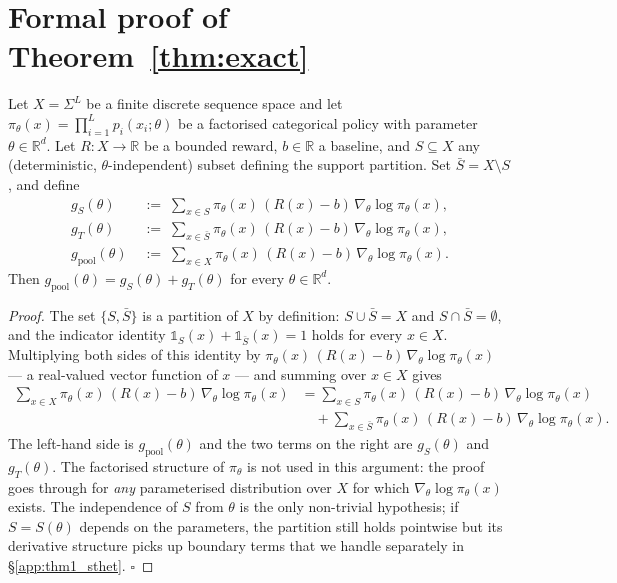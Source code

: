 \section{Formal proof of Theorem~\ref{thm:exact}}
\label{app:thm1}

\begin{theorem}
Let $X = \Sigma^L$ be a finite discrete sequence space and let
$\pi_\theta(x) = \prod_{i=1}^L p_i(x_i;\theta)$ be a factorised
categorical policy with parameter $\theta \in \mathbb{R}^d$. Let
$R: X \to \mathbb{R}$ be a bounded reward, $b \in \mathbb{R}$ a baseline,
and $S \subseteq X$ any (deterministic, $\theta$-independent) subset
defining the support partition. Set $\bar S = X \setminus S$, and define
\begin{align*}
g_S(\theta)        &\;:=\; \sum_{x\in S}        \pi_\theta(x) \,(R(x)-b)\, \nabla_\theta \log \pi_\theta(x), \\
g_T(\theta)        &\;:=\; \sum_{x\in \bar S}   \pi_\theta(x) \,(R(x)-b)\, \nabla_\theta \log \pi_\theta(x), \\
g_{\mathrm{pool}}(\theta) &\;:=\; \sum_{x\in X} \pi_\theta(x) \,(R(x)-b)\, \nabla_\theta \log \pi_\theta(x).
\end{align*}
Then $g_{\mathrm{pool}}(\theta) = g_S(\theta) + g_T(\theta)$ for every $\theta \in \mathbb{R}^d$.
\end{theorem}

\begin{proof}
The set $\{S, \bar S\}$ is a partition of $X$ by definition: $S \cup \bar S = X$ and $S \cap \bar S = \emptyset$, and the indicator identity $\mathbb{1}_S(x) + \mathbb{1}_{\bar S}(x) = 1$ holds for every $x \in X$. Multiplying both sides of this identity by $\pi_\theta(x)\,(R(x)-b)\,\nabla_\theta \log\pi_\theta(x)$ --- a real-valued vector function of $x$ --- and summing over $x \in X$ gives
\begin{align*}
\sum_{x\in X} \pi_\theta(x)\,(R(x)-b)\,\nabla_\theta \log\pi_\theta(x)
&= \sum_{x\in S} \pi_\theta(x)\,(R(x)-b)\,\nabla_\theta \log\pi_\theta(x) \\
&\quad + \sum_{x\in \bar S} \pi_\theta(x)\,(R(x)-b)\,\nabla_\theta \log\pi_\theta(x).
\end{align*}
The left-hand side is $g_{\mathrm{pool}}(\theta)$ and the two terms on the right are $g_S(\theta)$ and $g_T(\theta)$. The factorised structure of $\pi_\theta$ is not used in this argument: the proof goes through for \emph{any} parameterised distribution over $X$ for which $\nabla_\theta \log\pi_\theta(x)$ exists. The independence of $S$ from $\theta$ is the only non-trivial hypothesis; if $S = S(\theta)$ depends on the parameters, the partition still holds pointwise but its derivative structure picks up boundary terms that we handle separately in §\ref{app:thm1_sthet}.
\hfill$\square$
\end{proof}

